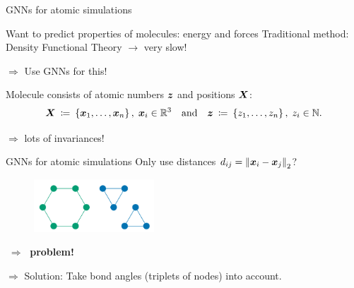 \begin{frame}{GNNs for atomic simulations}

    \begin{itemize}
        \bitem Want to predict properties of molecules: energy and forces
        \bitem Traditional method: Density Functional Theory $\rightarrow$ very slow!
    \end{itemize}
    $\Rightarrow$ Use GNNs for this!

    \begin{itemize}
        \bitem Molecule consists of atomic numbers $\boldsymbol{z}$ and positions $\boldsymbol{X}$:
        \[
            \boldsymbol{X} \: \coloneqq \: \left\{\boldsymbol{x}_1, \dots, \boldsymbol{x}_n\right\}, \; \boldsymbol{x}_i \in \mathbb{R}^3
            \quad \text{and} \quad 
            \boldsymbol{z} \: \coloneqq \: \left\{z_1, \dots, z_n\right\}, \; z_i \in \mathbb{N} \text{.}
            \label{eq:molecule_setup}
        \]
    \end{itemize}
    $\Rightarrow$ lots of invariances!
    
\end{frame}

\begin{frame}{GNNs for atomic simulations}
    Only use distances $d_{ij} = \left\lVert\boldsymbol{x}_i - \boldsymbol{x}_j\right\rVert_2$?
    \begin{figure}[H]
        \includegraphics[width=0.4\textwidth]{figures/gnns/indistinguishable.pdf}
        \vspace*{-1em}
    \end{figure}
    \begin{center}
        $\;\Rightarrow\;$ \textbf{problem!}
    \end{center}

    $\Rightarrow$ Solution: Take bond angles (triplets of nodes) into account.

\end{frame}

